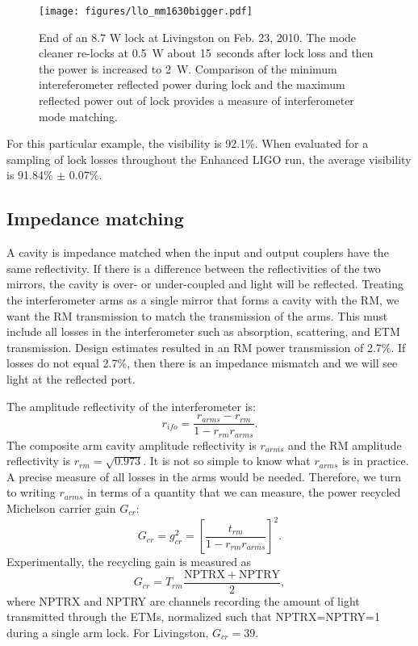 \begin{figure}
\begin{centering}
\texttt{[image: figures/llo\_mm1630bigger.pdf]}
\caption[End of an 8.7 W lock at Livingston on Feb. 23, 2010]{End of
  an 8.7 W lock at Livingston on Feb. 23, 2010. The mode cleaner
  re-locks at 0.5~W about 15~seconds after lock loss and then the
  power is increased to 2~W. Comparison of the minimum intereferometer
  reflected power during lock and the maximum reflected power out of
  lock provides a measure of interferometer mode matching.}
\label{fig:llomm1630}
\end{centering}
\end{figure}

For this particular example, the visibility is 92.1\%.  When evaluated
for a sampling of lock losses throughout the Enhanced LIGO run, the
average visibility is 91.84\% $\pm$ 0.07\%.





\subsection{Impedance matching}
\label{sec:impedance}
A cavity is impedance matched when the input and output couplers have
the same reflectivity. If there is a difference between the
reflectivities of the two mirrors, the cavity is over- or
under-coupled and light will be reflected. Treating the interferometer
arms as a single mirror that forms a cavity with the RM, we want the
RM transmission to match the transmission of the arms. This must
include all losses in the interferometer such as absorption,
scattering, and ETM transmission. Design estimates resulted in an RM
power transmission of 2.7\%. If losses do not equal 2.7\%, then there is an impedance mismatch and
we will see light at the reflected port. 

The amplitude reflectivity of the interferometer is:
\begin{equation} 
r_{ifo} = \frac{r_{arms}-r_{rm}}{1-r_{rm}r_{arms}}.
\end{equation}
The composite arm cavity amplitude reflectivity is $r_{arms}$ and the
RM amplitude reflectivity is $r_{rm} = \sqrt{0.973}$.  It is not so
simple to know what $r_{arms}$ is in practice. A precise measure of
all losses in the arms would be needed. Therefore, we turn to writing
$r_{arms}$ in terms of a quantity that we can measure, the power
recycled Michelson carrier gain $G_{cr}$:
\begin{equation}
G_{cr} = g_{cr}^2 = \left[\frac{t_{rm}}{1-r_{rm}r_{arms}}\right]^2.
\end{equation}
Experimentally, the recycling gain is measured as
\begin{equation}
G_{cr} = T_{rm} \frac{\mathrm{NPTRX + NPTRY}}{2},
\end{equation}
where NPTRX and NPTRY are channels recording the amount of light
transmitted through the ETMs, normalized such that NPTRX=NPTRY=1
during a single arm lock. For Livingston, $G_{cr} = 39$.

